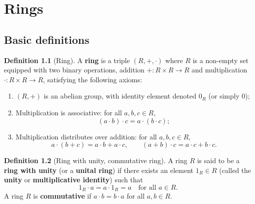 \documentclass[12pt,a4paper,openany]{book}
\theoremstyle{definition}
\newtheorem{definition}{Definition}[chapter]
\theoremstyle{remark}
\begin{document}

\chapter{Rings}\label{ch:rings}

\section{Basic definitions}\label{sec:ring-def}

\begin{definition}[Ring]\label{def:ring}
A \textbf{ring} is a triple $(R,+,\cdot)$ where $R$ is a non-empty set equipped with two binary operations, addition $+\colon R\times R\to R$ and multiplication $\cdot\colon R\times R\to R$, satisfying the following axioms:
\begin{enumerate}[label=(\roman*)]
    \item $(R,+)$ is an abelian group, with identity element denoted $0_R$ (or simply $0$);
    \item Multiplication is associative: for all $a,b,c\in R$,
    \[
        (a\cdot b)\cdot c = a\cdot(b\cdot c);
    \]
    \item Multiplication distributes over addition: for all $a,b,c\in R$,
    \[
        a\cdot(b+c)=a\cdot b+a\cdot c,\qquad (a+b)\cdot c=a\cdot c+b\cdot c.
    \]
\end{enumerate}
\end{definition}

\begin{definition}[Ring with unity, commutative ring]\label{def:ring-unity-comm}
A ring $R$ is said to be a \textbf{ring with unity} (or a \textbf{unital ring}) if there exists an element $1_R\in R$ (called the \textbf{unity} or \textbf{multiplicative identity}) such that
\[
    1_R\cdot a = a\cdot 1_R = a \quad\text{for all } a\in R.
\]
A ring $R$ is \textbf{commutative} if $a\cdot b = b\cdot a$ for all $a,b\in R$.
\end{definition}
\end{document}
